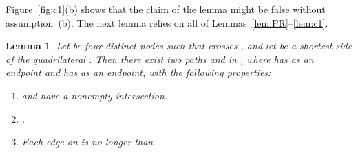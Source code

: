 \pdfoutput=1  \documentclass[11pt]{article}
\newtheorem{lemma}{Lemma}
\begin{document}
\noindent
Figure~\ref{fig:c1}(b) shows that the claim of the lemma might be false without
assumption~(b).
The next lemma relies on all of Lemmas~\ref{lem:PR}--\ref{lem:c1}.

\begin{lemma}
Let  be four distinct nodes such that
 crosses
, and let
 be a shortest side of the quadrilateral .
Then there exist two paths  and  in , where
 has  as an endpoint and  has  as an endpoint,
with the following properties:
\begin{enumerate}
\item[(a)]  and  have a nonempty intersection.
\item[(b)] .
\item[(c)] Each edge on  is no longer than .
\end{enumerate}
\label{lem:pathcross}
\end{lemma}
\end{document}
